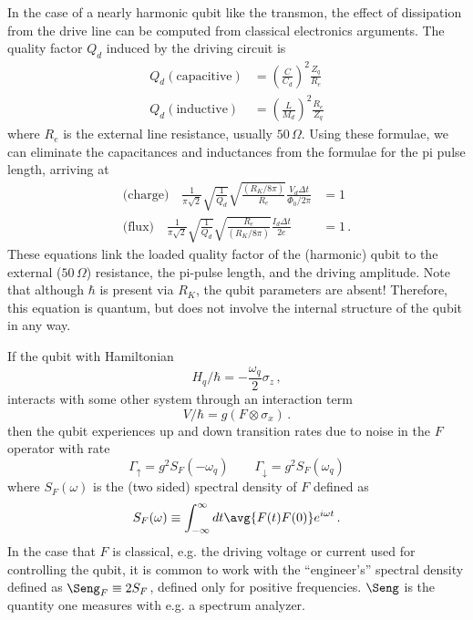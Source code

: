 In the case of a nearly harmonic qubit like the transmon, the effect of dissipation from the drive line can be computed from classical electronics arguments.
The quality factor $Q_d$ induced by the driving circuit is
\begin{align*}
  Q_d (\text{capacitive}) &= \left( \frac{C}{C_d} \right)^2 \frac{Z_q}{R_e} \\
  Q_d (\text{inductive}) &= \left( \frac{L}{M_d} \right)^2 \frac{R_e}{Z_q}
\end{align*}
where $R_e$ is the external line resistance, usually $50 \, \Omega$.
Using these formulae, we can eliminate the capacitances and inductances from the formulae for the pi pulse length, arriving at
\begin{align*}
  \text{(charge)} \quad
    \frac{1}{\pi\sqrt{2}} \sqrt{\frac{1}{Q_d}}
    \sqrt{\frac{(R_K/8\pi)}{R_e}} \frac{V_d \Delta t}{\Phi_0/2\pi} &= 1 \\
  \text{(flux)} \quad
    \frac{1}{\pi\sqrt{2}} \sqrt{\frac{1}{Q_d}}
    \sqrt{\frac{R_e}{(R_K/8\pi)}} \frac{I_d \Delta t}{2e} &= 1 \, .
\end{align*}
These equations link the loaded quality factor of the (harmonic) qubit to the external ($50 \, \Omega$) resistance, the pi-pulse length, and the driving amplitude.
Note that although $\hbar$ is present via $R_K$, the qubit parameters are absent!
Therefore, this equation is quantum, but does not involve the internal structure of the qubit in any way.


If the qubit with Hamiltonian
\begin{equation*}
  H_q / \hbar = - \frac{\omega_q}{2} \sigma_z \, ,
\end{equation*}
interacts with some other system through an interaction term
\begin{equation*}
  V / \hbar = g(F \otimes \sigma_x) \, .
\end{equation*}
then the qubit experiences up and down transition rates due to noise in the $F$ operator with rate \cite{Schoelkopf:quantum_noise2002}
\begin{equation*}
  \Gamma_\uparrow = g^2 S_F(- \omega_q) \qquad \Gamma_\downarrow = g^2 S_F(\omega_q)
\end{equation*}
where $S_F(\omega)$ is the (two sided) spectral density of $F$ defined as
\begin{equation*}
  S_F(\omega) \equiv \int_{-\infty}^\infty dt \avg{F(t) F(0)} e^{i \omega t} \, .
\end{equation*}
In the case that $F$ is classical, e.g. the driving voltage or current used for controlling the qubit, it is common to work with the ``engineer's'' spectral density defined as $\Seng_F \equiv 2 S_F$, defined only for positive frequencies.
$\Seng$ is the quantity one measures with e.g. a spectrum analyzer.

